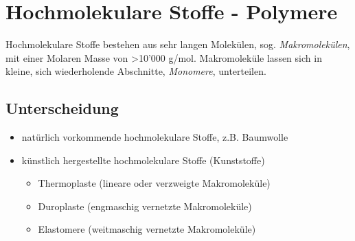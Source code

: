\section{Hochmolekulare Stoffe - Polymere}
Hochmolekulare Stoffe bestehen aus sehr langen Molekülen, sog. \emph{Makromolekülen}, mit einer Molaren Masse von >10'000 g/mol. Makromoleküle lassen sich in kleine, sich wiederholende Abschnitte, \emph{Monomere}, unterteilen. \\

\subsection{Unterscheidung}
\begin{itemize}
	\item natürlich vorkommende hochmolekulare Stoffe, z.B. Baumwolle
	\item künstlich hergestellte hochmolekulare Stoffe (Kunststoffe)
		\begin{itemize}
			\item Thermoplaste (lineare oder verzweigte Makromoleküle)
			\item Duroplaste (engmaschig vernetzte Makromoleküle)
			\item Elastomere (weitmaschig vernetzte Makromoleküle)
		\end{itemize}
\end{itemize}

